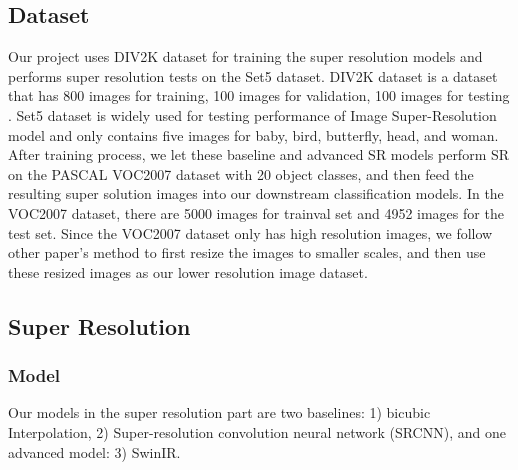 \documentclass[10pt,twocolumn,letterpaper]{article}
\begin{document}
\subsection{Dataset}
Our project uses DIV2K dataset for training the super resolution models and performs super resolution tests on the Set5 dataset. DIV2K dataset is a dataset that has 800 images for training, 100 images for validation, 100 images for testing \cite{agustsson2017ntire}. Set5 dataset is widely used for testing performance of Image Super-Resolution model and only contains five images for baby, bird, butterfly, head, and woman\cite{bevilacqua2012low}. After training process, we let these baseline and advanced SR models perform SR on the PASCAL VOC2007 dataset with 20 object classes, and then feed the resulting super solution images into our downstream classification models\cite{everingham2008pascal}. In the VOC2007 dataset, there are 5000 images for trainval set and 4952 images for the test set. Since the VOC2007 dataset only has high resolution images, we follow other paper's method to first resize the images to smaller scales\cite{wu2019unsupervised}, and then use these resized images as our lower resolution image dataset. 

\subsection{Super Resolution}

\subsubsection{Model}
Our models in the super resolution part are two baselines: 1) bicubic Interpolation, 2) Super-resolution convolution neural network (SRCNN), and one advanced model: 3) SwinIR.
\end{document}
